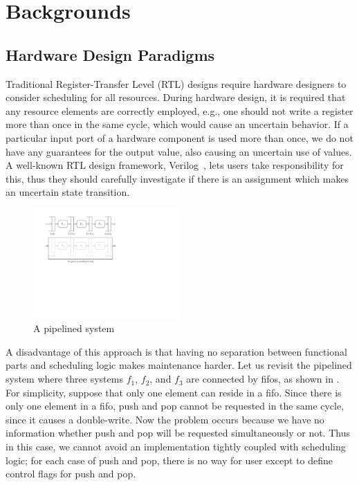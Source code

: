 \chapter{Backgrounds}
\label{chap:backgrounds}

\section{Hardware Design Paradigms}
\label{sec:design-paradigm}

Traditional Register-Transfer Level (RTL) designs require hardware
designers to consider scheduling for all resources. During hardware
design, it is required that any resource elements are correctly
employed, e.g., one should not write a register more than once in the
same cycle, which would cause an uncertain behavior. If a particular
input port of a hardware component is used more than once, we do not
have any guarantees for the output value, also causing an uncertain
use of values. A well-known RTL design framework,
Verilog~\cite{verilog}, lets users take responsibility for this, thus
they should carefully investigate if there is an assignment which
makes an uncertain state transition.
\begin{figure}[h]
  \centering
  \includegraphics[width=0.5\textwidth]{figures/pipeline.pdf}
  \caption{A pipelined system}
  \label{fig-pipelined-system}
\end{figure}

A disadvantage of this approach is that having no separation between
functional parts and scheduling logic makes maintenance harder. Let us
revisit the pipelined system where three systems $f_1$, $f_2$, and
$f_3$ are connected by fifos, as shown in
. For simplicity, suppose that only one
element can reside in a fifo. Since there is only one element in a
fifo, push and pop cannot be requested in the same cycle, since it
causes a double-write. Now the problem occurs because we have no
information whether push and pop will be requested simultaneously or
not. Thus in this case, we cannot avoid an implementation tightly
coupled with scheduling logic; for each case of push and pop, there is
no way for user except to define control flags for push and pop.


